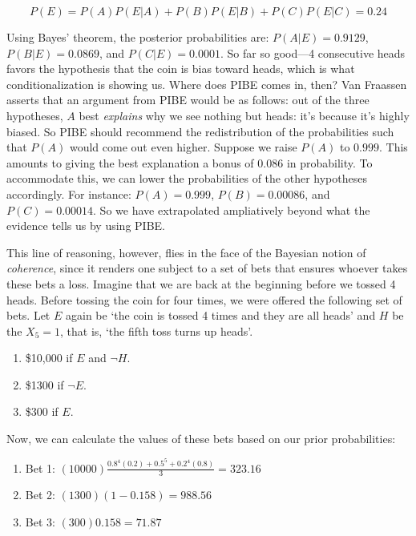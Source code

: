 \[P(E) = P(A)P(E|A)+P(B)P(E|B)+P(C)P(E|C) = 0.24\]

Using Bayes' theorem, the posterior probabilities are:
\(P(A|E) = 0.9129\), \(P(B|E) = 0.0869\), and \(P(C|E) = 0.0001\). So
far so good---4 consecutive heads favors the hypothesis that the coin is
bias toward heads, which is what conditionalization is showing us. Where
does PIBE comes in, then? Van Fraassen asserts that an argument from
PIBE would be as follows: out of the three hypotheses, \(A\) best
\emph{explains} why we see nothing but heads: it's because it's highly
biased. So PIBE should recommend the redistribution of the
probabilities such that \(P(A)\) would come out even higher. Suppose we raise
\(P(A)\) to \(0.999\). This amounts to giving the best explanation a
bonus of \(0.086\) in probability. To accommodate this, we can lower the
probabilities of the other hypotheses accordingly. For instance:
\(P(A) = 0.999\), \(P(B) = 0.00086\), and \(P(C) = 0.00014\). So we have
extrapolated ampliatively beyond what the evidence tells us by using
PIBE.

This line of reasoning, however, flies in the face of the Bayesian
notion of \emph{coherence}, since it renders one subject to a set of bets
that ensures whoever takes these bets a loss. Imagine that we are back
at the beginning before we tossed 4 heads. Before tossing the coin for
four times, we were offered the following set of bets. Let \(E\) again
be `the coin is tossed 4 times and they are all heads' and \(H\) be the
\(X_5=1\), that is, `the fifth toss turns up heads'.

\begin{enumerate}
\def\labelenumi{\arabic{enumi}.}
\tightlist
\item
  \$10,000 if \(E\) and \(\neg H\).
\item
  \$1300 if \(\neg E\).
\item
  \$300 if \(E\).
\end{enumerate}

Now, we can calculate the values of these bets based on our prior
probabilities:

\begin{enumerate}
\def\labelenumi{\arabic{enumi}.}
\tightlist
\item
  Bet 1: \((10000) \frac{0.8^4(0.2) + 0.5^5 + 0.2^4(0.8)}{3} = 323.16\)
\item
  Bet 2: \((1300) (1-0.158) = 988.56\)
\item
  Bet 3: \((300) 0.158 = 71.87\)
\end{enumerate}

